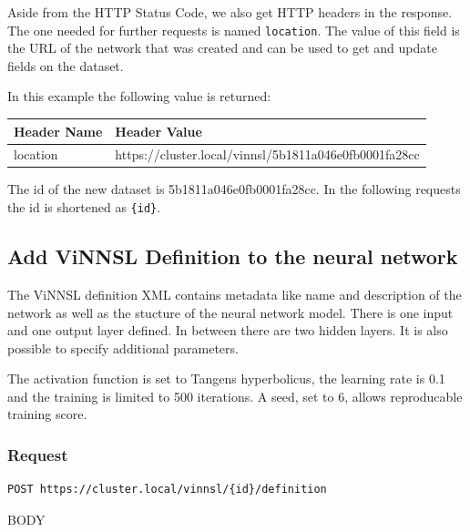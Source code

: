 Aside from the HTTP Status Code, we also get HTTP headers in the
response. The one needed for further requests is named
\texttt{location}. The value of this field is the URL of the network
that was created and can be used to get and update fields on the
dataset.

In this example the following value is returned:

\begin{longtable}[]{@{}ll@{}}
\toprule
Header Name & Header Value\tabularnewline
\midrule
\endhead
location &
https://cluster.local/vinnsl/5b1811a046e0fb0001fa28cc\tabularnewline
\bottomrule
\end{longtable}

The id of the new dataset is 5b1811a046e0fb0001fa28cc. In the following
requests the id is shortened as \texttt{\{id\}}.

\subsection{Add ViNNSL Definition to the neural
network}\label{add-vinnsl-definition-to-the-neural-network}

The ViNNSL definition XML contains metadata like name and description of
the network as well as the stucture of the neural network model. There
is one input and one output layer defined. In between there are two
hidden layers. It is also possible to specify additional parameters.

The activation function is set to Tangens hyperbolicus, the learning
rate is 0.1 and the training is limited to 500 iterations. A seed, set
to 6, allows reproducable training score.

\subsubsection{Request}\label{request-1}

\begin{verbatim}
POST https://cluster.local/vinnsl/{id}/definition
\end{verbatim}

BODY

